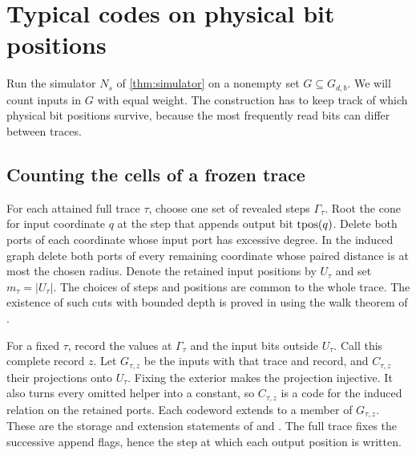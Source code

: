 \section{Typical codes on physical bit positions}\label{sec:native}

Run the simulator $N_s$ of \cref{thm:simulator} on a nonempty set
$G\subseteq G_{d,b}$. We will count inputs in $G$ with equal weight. The
construction has to keep track of which physical bit positions survive,
because the most frequently read bits can differ between traces.

\subsection{Counting the cells of a frozen trace}\label{sec:records}

For each attained full trace $\tau$, choose one set of revealed steps
$\Gamma_\tau$. Root the cone for input coordinate $q$ at the step that
appends output bit $\operatorname{tpos}(q)$. Delete both ports of each coordinate
whose input port has excessive degree. In the induced graph delete both
ports of every remaining coordinate whose paired distance is at most the
chosen radius. Denote the retained input positions by $U_\tau$ and set
$m_\tau=|U_\tau|$. The choices of steps and positions are common to the
whole trace. The existence of such cuts with bounded depth is proved in
 using the walk theorem
of \cite[Corollary~O(a)]{PaperFourteen}.

For a fixed $\tau$, record the values at $\Gamma_\tau$ and the input bits
outside $U_\tau$. Call this complete record $z$. Let $G_{\tau,z}$ be
the inputs with that trace and record, and $C_{\tau,z}$ their
projections onto $U_\tau$. Fixing the exterior makes the projection
injective. It also turns every omitted helper into a constant, so
$C_{\tau,z}$ is a code for the induced relation on the retained ports.
Each codeword extends to a member of $G_{\tau,z}$.
These are the storage and extension statements of
 and
. The full trace fixes the successive append flags, hence the step at
which each output position is written.

